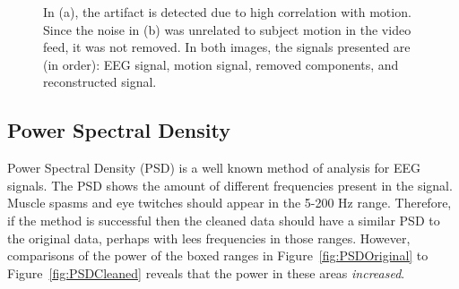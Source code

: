 \documentclass{acm_proc_article-sp}
\begin{document}
\begin{figure}
  \hfill
  \caption{In (a), the artifact is detected due to high correlation
    with motion. Since the noise in (b) was unrelated to subject
    motion in the video feed, it was not
    removed. In both images, the signals presented are (in order): EEG signal,
    motion signal, removed components, and reconstructed signal.}\label{fig:ResultsTime}
\end{figure}

\subsection{Power Spectral Density}
Power Spectral Density (PSD) is a well known method of analysis for EEG
signals\cite{schwilden2006}. The PSD shows the amount of different
frequencies present in the signal. Muscle spasms and eye twitches
should appear in the 5-200 Hz range. Therefore, if the method is successful
then the cleaned data should have a similar PSD to the original data,
perhaps with lees frequencies in those ranges. However, comparisons of
the power of the boxed ranges in Figure~\ref{fig:PSDOriginal} to
Figure~\ref{fig:PSDCleaned} reveals that the power in these areas
\emph{increased}.
\end{document}
